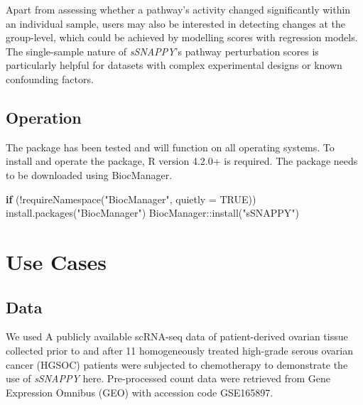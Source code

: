 \documentclass[9pt,a4paper,]{extarticle}
\newenvironment{Shaded}{\begin{snugshade}}{\end{snugshade}}
\newcommand{\AttributeTok}[1]{\textcolor[rgb]{0.77,0.63,0.00}{#1}}
\newcommand{\ConstantTok}[1]{\textcolor[rgb]{0.00,0.00,0.00}{#1}}
\newcommand{\ControlFlowTok}[1]{\textcolor[rgb]{0.13,0.29,0.53}{\textbf{#1}}}
\newcommand{\FunctionTok}[1]{\textcolor[rgb]{0.00,0.00,0.00}{#1}}
\newcommand{\NormalTok}[1]{#1}
\newcommand{\SpecialCharTok}[1]{\textcolor[rgb]{0.00,0.00,0.00}{#1}}
\newcommand{\StringTok}[1]{\textcolor[rgb]{0.31,0.60,0.02}{#1}}
\begin{document}
Apart from assessing whether a pathway's activity changed significantly within an individual sample, users may also be interested in detecting changes at the group-level, which could be achieved by modelling scores with regression models. The single-sample nature of \emph{sSNAPPY}'s pathway perturbation scores is particularly helpful for datasets with complex experimental designs or known confounding factors.

\hypertarget{operation}{%
\subsection{Operation}\label{operation}}

The package has been tested and will function on all operating systems. To install and operate the package, R version 4.2.0+ is required. The package needs to be downloaded using BiocManager.

\begin{Shaded}
\begin{Highlighting}[]
\ControlFlowTok{if}\NormalTok{ (}\SpecialCharTok{!}\FunctionTok{requireNamespace}\NormalTok{(}\StringTok{"BiocManager"}\NormalTok{, }\AttributeTok{quietly =} \ConstantTok{TRUE}\NormalTok{))}
\FunctionTok{install.packages}\NormalTok{(}\StringTok{"BiocManager"}\NormalTok{)}
\NormalTok{BiocManager}\SpecialCharTok{::}\FunctionTok{install}\NormalTok{(}\StringTok{"sSNAPPY"}\NormalTok{)}
\end{Highlighting}
\end{Shaded}

\hypertarget{use-cases}{%
\section{Use Cases}\label{use-cases}}

\hypertarget{data}{%
\subsection{Data}\label{data}}

We used A publicly available scRNA-seq data of patient-derived ovarian tissue collected prior to and after 11 homogeneously treated high-grade serous ovarian cancer (HGSOC) patients were subjected to chemotherapy\citep{Zhang2022} to demonstrate the use of \emph{sSNAPPY} here. Pre-processed count data were retrieved from Gene Expression Omnibus (GEO) with accession code GSE165897.
\end{document}
